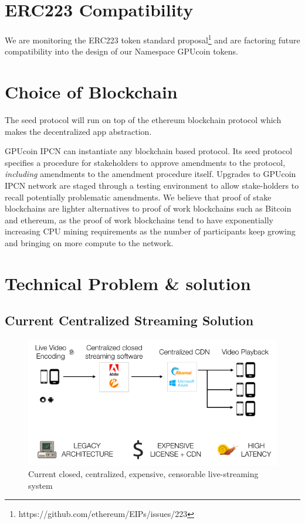 \documentclass{article}
\begin{document}
\section{ERC223 Compatibility}
We are monitoring the ERC223 token standard proposal\footnote{https://github.com/ethereum/EIPs/issues/223} and are factoring future compatibility into the design of our Namespace GPUcoin tokens.

\section{Choice of Blockchain}
The seed protocol will run on top of the ethereum blockchain protocol which makes the decentralized app abstraction. 



GPUcoin IPCN can instantiate any blockchain based protocol. Its seed protocol specifies a procedure for stakeholders to approve amendments to the protocol, \emph{including} amendments to the amendment procedure itself. Upgrades to GPUcoin IPCN network are staged through a testing environment to allow stake-holders to recall potentially problematic amendments. We believe that proof of stake blockchains are lighter alternatives to proof of work blockchains such as Bitcoin and ethereum, as the proof of work blockchains tend to have exponentially increasing CPU mining requirements as the number of participants keep growing and bringing on more compute to the network.

\section{Technical Problem \& solution}


\subsection{Current Centralized Streaming Solution}

\begin{figure}[h!]
 \centering
 \includegraphics[width=1.0\textwidth]{static/problem-architecture-trans}
 \caption{Current closed, centralized, expensive, censorable live-streaming system}
 \label{image:problem-architecture-trans}
\end{figure}
\end{document}
